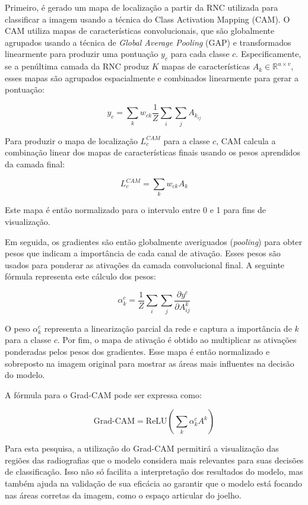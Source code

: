 Primeiro, é gerado um mapa de localização a partir da RNC utilizada para classificar a imagem usando a técnica do Class Activation Mapping (CAM). O CAM utiliza mapas de características convolucionais, que são globalmente agrupados usando a técnica de \textit{Global Average Pooling} (GAP) e transformados linearmente para produzir uma pontuação \( y_c \) para cada classe \( c \). Especificamente, se a penúltima camada da RNC produz \( K \) mapas de características \( A_k \in \mathbb{R}^{u \times v} \), esses mapas são agrupados espacialmente e combinados linearmente para gerar a pontuação:

\[
y_c = \sum_k w_{ck} \frac{1}{Z} \sum_i \sum_j A_{k_{ij}}
\]

Para produzir o mapa de localização \( L_c^{CAM} \) para a classe \( c \), CAM calcula a combinação linear dos mapas de características finais usando os pesos aprendidos da camada final:

\[
L_c^{CAM} = \sum_k w_{ck} A_k
\]

Este mapa é então normalizado para o intervalo entre 0 e 1 para fins de visualização.

Em seguida, os gradientes são então globalmente averiguados (\textit{pooling}) para obter pesos que indicam a importância de cada canal de ativação. Esses pesos são usados para ponderar as ativações da camada convolucional final. A seguinte fórmula representa este cálculo dos pesos:

\[
\alpha_{k}^{c} = \frac{1}{Z} \sum_i \sum_j \frac{\partial y^{c}}{\partial A_{ij}^{k}}
\]

O peso \( \alpha_{k}^{c} \) representa a linearização parcial da rede e captura a importância de \(k \) para a classe \(c \). Por fim, o mapa de ativação é obtido ao multiplicar as ativações ponderadas pelos pesos dos gradientes. Esse mapa é então normalizado e sobreposto na imagem original para mostrar as áreas mais influentes na decisão do modelo.

A fórmula para o Grad-CAM pode ser expressa como:

\[
\text{Grad-CAM} = \text{ReLU} \left( \sum_{k} \alpha_{k}^{c} A^{k} \right)
\]

Para esta pesquisa, a utilização do Grad-CAM permitirá a visualização das regiões das radiografias que o modelo considera mais relevantes para suas decisões de classificação. Isso não só facilita a interpretação dos resultados do modelo, mas também ajuda na validação de sua eficácia ao garantir que o modelo está focando nas áreas corretas da imagem, como o espaço articular do joelho.